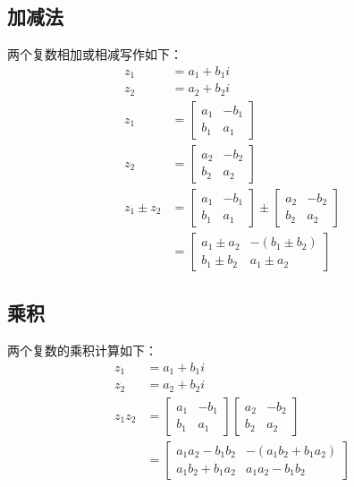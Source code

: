 \subsection{加减法}
两个复数相加或相减写作如下：
$$
\begin{aligned}
z_{1} & =a_{1}+b_{1} i \\
z_{2} & =a_{2}+b_{2} i \\
z_{1} & =\left[\begin{array}{cc}
a_{1} & -b_{1} \\
b_{1} & a_{1}
\end{array}\right] \\
z_{2} & =\left[\begin{array}{ll}
a_{2} & -b_{2} \\
b_{2} & a_{2}
\end{array}\right] \\
z_{1} \pm z_{2} & =\left[\begin{array}{ll}
a_{1} & -b_{1} \\
b_{1} & a_{1}
\end{array}\right] \pm\left[\begin{array}{ll}
a_{2} & -b_{2} \\
b_{2} & a_{2}
\end{array}\right] \\
& =\left[\begin{array}{ll}
a_{1} \pm a_{2} & -\left(b_{1} \pm b_{2}\right) \\
b_{1} \pm b_{2} & a_{1} \pm a_{2}
\end{array}\right]
\end{aligned}
$$

\subsection{乘积}
两个复数的乘积计算如下：
$$
\begin{aligned}
z_{1} & =a_{1}+b_{1} i \\
z_{2} & =a_{2}+b_{2} i \\
z_{1} z_{2} & =\left[\begin{array}{cc}
a_{1} & -b_{1} \\
b_{1} & a_{1}
\end{array}\right]\left[\begin{array}{cc}
a_{2} & -b_{2} \\
b_{2} & a_{2}
\end{array}\right] \\
& =\left[\begin{array}{cc}
a_{1} a_{2}-b_{1} b_{2} & -\left(a_{1} b_{2}+b_{1} a_{2}\right) \\
a_{1} b_{2}+b_{1} a_{2} & a_{1} a_{2}-b_{1} b_{2}
\end{array}\right]
\end{aligned}
$$

